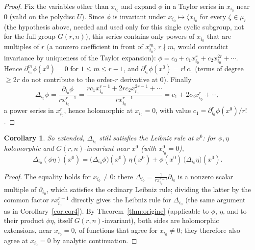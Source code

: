 \documentclass[10pt,a4paper]{amsart}
\newtheorem{corollary}[theorem]{Corollary}
\begin{document}
\begin{proof}
Fix the variables other than $x_{i_0}$ and expand $\phi$ in a Taylor series in $x_{i_0}$ near $0$ (valid on the polydisc $U$). Since $\phi$ is invariant under $x_{i_0}\mapsto\zeta x_{i_0}$ for every $\zeta\in\mu_r$ (the hypothesis above, needed and used only for this single cyclic subgroup, not for the full group $G(r,n)$), this series contains only powers of $x_{i_0}$ that are multiples of $r$ (a nonzero coefficient in front of $x_{i_0}^m$, $r\nmid m$, would contradict invariance by uniqueness of the Taylor expansion): $\phi=c_0+c_1x_{i_0}^r+c_2x_{i_0}^{2r}+\cdots$. Hence $\partial_{i_0}^m\phi(x^0)=0$ for $1\le m\le r-1$, and $\partial_{i_0}^r\phi(x^0)=r!\,c_1$ (terms of degree $\ge2r$ do not contribute to the order-$r$ derivative at $0$). Finally
\[
\Delta_{i_0}\phi = \frac{\partial_{i_0}\phi}{rx_{i_0}^{r-1}} = \frac{rc_1x_{i_0}^{r-1}+2rc_2x_{i_0}^{2r-1}+\cdots}{rx_{i_0}^{r-1}} = c_1+2c_2x_{i_0}^r+\cdots,
\]
a power series in $x_{i_0}^r$, hence holomorphic at $x_{i_0}=0$, with value $c_1=\partial_{i_0}^r\phi(x^0)/r!$.
\end{proof}


\begin{corollary}\label{cor:leibniz-origine}
So extended, $\Delta_{i_0}$ still satisfies the Leibniz rule at $x^0$: for $\phi,\eta$ holomorphic and $G(r,n)$-invariant near $x^0$ (with $x_{i_0}^0=0$),
\[
\Delta_{i_0}(\phi\eta)(x^0) = \big(\Delta_{i_0}\phi\big)(x^0)\,\eta(x^0) + \phi(x^0)\,\big(\Delta_{i_0}\eta\big)(x^0).
\]
\end{corollary}

\begin{proof}
The equality holds for $x_{i_0}\ne0$: there $\Delta_{i_0}=\frac{1}{rx_{i_0}^{r-1}}\partial_{i_0}$ is a nonzero scalar multiple of $\partial_{i_0}$, which satisfies the ordinary Leibniz rule; dividing the latter by the common factor $rx_{i_0}^{r-1}$ directly gives the Leibniz rule for $\Delta_{i_0}$ (the same argument as in Corollary~\ref{cor:cor4}). By Theorem~\ref{thm:origine} (applicable to $\phi$, $\eta$, and to their product $\phi\eta$, itself $G(r,n)$-invariant), both sides are holomorphic extensions, near $x_{i_0}=0$, of functions that agree for $x_{i_0}\ne0$; they therefore also agree at $x_{i_0}=0$ by analytic continuation.
\end{proof}
\end{document}
